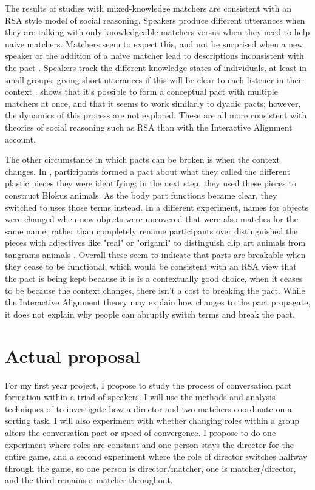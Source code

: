 \documentclass[11pt]{article}
\begin{document}
The results of studies with mixed-knowledge matchers are consistent with an RSA style model of social reasoning. Speakers produce different utterances when they are talking with only knowledgeable matchers versus when they need to help naive matchers. Matchers seem to expect this, and not be surprised when a new speaker or the addition of a naive matcher lead to descriptions inconsistent with the pact \cite{yoonAdjustingConceptualPacts2014, metzingWhenConceptualPacts2003}. Speakers track the different knowledge states of individuals, at least in small groups; giving short utterances if this will be clear to each listener in their context \cite{yoonContextualIntegrationMultiparty2019}. \cite{yoonAudienceDesignMultiparty2019} shows that it's possible to form a conceptual pact with multiple matchers at once, and that it seems to work similarly to dyadic pacts; however, the dynamics of this process are not explored. These are all more consistent with theories of social reasoning such as RSA than with the Interactive Alignment account.  

The other circumstance in which pacts can be broken is when the context changes. In \cite{ibarraFlexibilityConceptualPacts2016}, participants formed a pact about what they called the different plastic pieces they were identifying; in the next step, they used these pieces to construct Blokus animals. As the body part functions became clear, they switched to uses those terms instead. In a different experiment, names for objects were changed when new objects were uncovered that were also matches for the same name; rather than completely rename participants over distinguished the pieces with adjectives like "real" or "origami" to distinguish clip art animals from tangrams animals \cite{ibarraFlexibilityConceptualPacts2016}. Overall these seem to indicate that parts are breakable when they cease to be functional, which would be consistent with an RSA view that the pact is being kept because it is is a contextually good choice, when it ceases to be because the context changes, there isn't a cost to breaking the pact. While the Interactive Alignment theory may explain how changes to the pact propagate, it does not explain why people can abruptly switch terms and break the pact. 

	

\section{Actual proposal}
For my first year project, I propose to study the process of conversation pact formation within a triad of speakers. I will use the methods and analysis techniques of \cite{hawkinsCharacterizingDynamicsLearning2020} to investigate how a director and two matchers coordinate on a sorting task. I will also experiment with whether changing roles within a group alters the conversation pact or speed of convergence. I propose to do one experiment where roles are constant and one person stays the director for the entire game, and a second experiment where the role of director switches halfway through the game, so one person is director/matcher, one is matcher/director, and the third remains a matcher throughout.
\end{document}
